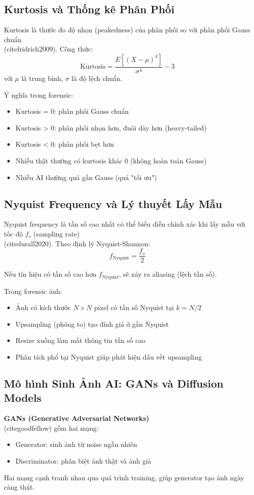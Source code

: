 \subsection{Kurtosis và Thống kê Phân Phối}
Kurtosis là thước đo độ nhọn (peakedness) của phân phối so với phân phối Gauss chuẩn \\(cite{fridrich2009}). Công thức:
\[
\text{Kurtosis}=\frac{E[(X-\mu)^4]}{\sigma^4}-3
\]
với $\mu$ là trung bình, $\sigma$ là độ lệch chuẩn.

Ý nghĩa trong forensic:
\begin{itemize}
  \item Kurtosis = 0: phân phối Gauss chuẩn
  \item Kurtosis > 0: phân phối nhọn hơn, đuôi dày hơn (heavy-tailed)
  \item Kurtosis < 0: phân phối bẹt hơn
  \item Nhiễu thật thường có kurtosis khác 0 (không hoàn toàn Gauss)
  \item Nhiễu AI thường quá gần Gauss (quá "tối ưu")
\end{itemize}

\subsection{Nyquist Frequency và Lý thuyết Lấy Mẫu}
Nyquist frequency là tần số cao nhất có thể biểu diễn chính xác khi lấy mẫu với tốc độ $f_s$ (sampling rate) \\(cite{durall2020}). Theo định lý Nyquist-Shannon:
\[
f_{\text{Nyquist}}=\frac{f_s}{2}
\]

Nếu tín hiệu có tần số cao hơn $f_{\text{Nyquist}}$, sẽ xảy ra aliasing (lệch tần số).

Trong forensic ảnh:
\begin{itemize}
  \item Ảnh có kích thước $N\times N$ pixel có tần số Nyquist tại $k=N/2$
  \item Upsampling (phóng to) tạo đỉnh giả ở gần Nyquist
  \item Resize xuống làm mất thông tin tần số cao
  \item Phân tích phổ tại Nyquist giúp phát hiện dấu vết upsampling
\end{itemize}

\subsection{Mô hình Sinh Ảnh AI: GANs và Diffusion Models}
\textbf{GANs (Generative Adversarial Networks)} \\(cite{goodfellow}) gồm hai mạng:
\begin{itemize}
  \item Generator: sinh ảnh từ noise ngẫu nhiên
  \item Discriminator: phân biệt ảnh thật và ảnh giả
\end{itemize}
Hai mạng cạnh tranh nhau qua quá trình training, giúp generator tạo ảnh ngày càng thật.

